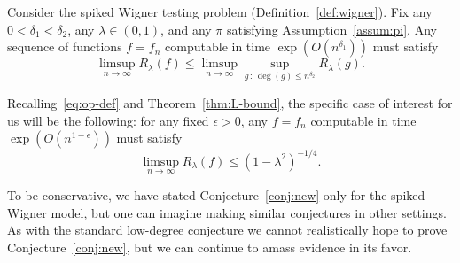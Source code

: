 \documentclass[11pt]{article}
\begin{document}
\begin{conjecture}\label{conj:new}
Consider the spiked Wigner testing problem (Definition~\ref{def:wigner}). Fix any $0 < \delta_1 < \delta_2$, any $\lambda \in (0,1)$, and any $\pi$ satisfying Assumption~\ref{assum:pi}. Any sequence of functions $f = f_n$ computable in time $\exp(O(n^{\delta_1}))$ must satisfy
\begin{equation}\label{eq:conj-ratio}
\limsup_{n \to \infty} R_\lambda(f) \le \limsup_{n \to \infty} \sup_{g \,:\, \deg(g) \le n^{\delta_2}} R_\lambda(g).
\end{equation}
\end{conjecture}

\noindent Recalling~\eqref{eq:op-def} and Theorem~\ref{thm:L-bound}, the specific case of interest for us will be the following: for any fixed $\epsilon > 0$, any $f = f_n$ computable in time $\exp(O(n^{1-\epsilon}))$ must satisfy
\begin{equation}\label{eq:conj-specific}
\limsup_{n \to \infty} R_\lambda(f) \le (1-\lambda^2)^{-1/4}.
\end{equation}

To be conservative, we have stated Conjecture~\ref{conj:new} only for the spiked Wigner model, but one can imagine making similar conjectures in other settings. As with the standard low-degree conjecture we cannot realistically hope to prove Conjecture~\ref{conj:new}, but we can continue to amass evidence in its favor.
\end{document}
